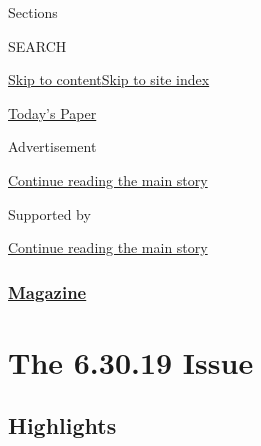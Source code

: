 Sections

SEARCH

\protect\hyperlink{site-content}{Skip to
content}\protect\hyperlink{site-index}{Skip to site index}

\href{https://myaccount.nytimes3xbfgragh.onion/auth/login?response_type=cookie\&client_id=vi}{}

\href{https://www.nytimes3xbfgragh.onion/section/todayspaper}{Today's
Paper}

Advertisement

\protect\hyperlink{after-top}{Continue reading the main story}

Supported by

\protect\hyperlink{after-sponsor}{Continue reading the main story}

\hypertarget{magazine}{%
\subsubsection{\texorpdfstring{\href{/section/magazine}{Magazine}}{Magazine}}\label{magazine}}

\hypertarget{the-63019-issue}{%
\section{The 6.30.19 Issue}\label{the-63019-issue}}

\hypertarget{highlights}{%
\subsection{Highlights}\label{highlights}}

